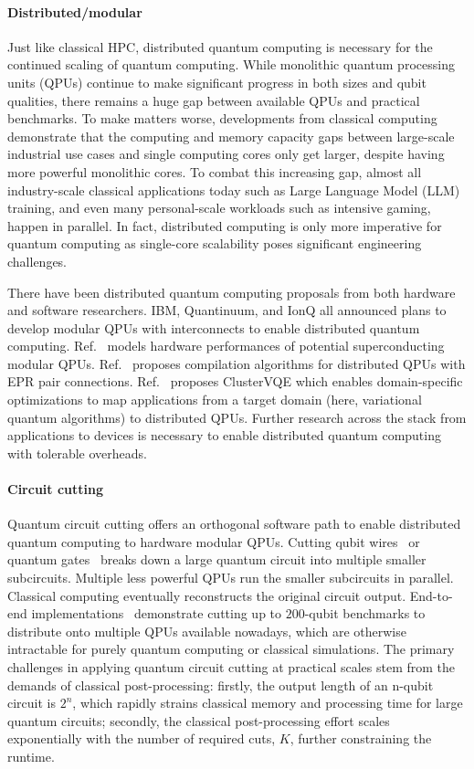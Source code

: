 \paragraph{Distributed/modular}
Just like classical HPC, distributed quantum computing is necessary for the continued scaling of quantum computing. While monolithic quantum processing units (QPUs) continue to make significant progress in both sizes and qubit qualities, there remains a huge gap between available QPUs and practical benchmarks. To make matters worse, developments from classical computing demonstrate that the computing and memory capacity gaps between large-scale industrial use cases and single computing cores only get larger, despite having more powerful monolithic cores. To combat this increasing gap, almost all industry-scale classical applications today such as Large Language Model (LLM) training, and even many personal-scale workloads such as intensive gaming, happen in parallel. In fact, distributed computing is only more imperative for quantum computing as single-core scalability poses significant engineering challenges.

There have been distributed quantum computing proposals from both hardware and software researchers. IBM, Quantinuum, and IonQ all announced plans to develop modular QPUs with interconnects to enable distributed quantum computing.
Ref.~\cite{ang2022architectures} models hardware performances of potential superconducting modular QPUs.
Ref.~\cite{wu2022collcomm} proposes compilation algorithms for distributed QPUs with EPR pair connections. 
Ref.~\cite{Zhang_2022} proposes ClusterVQE which enables domain-specific optimizations to map applications from a target domain (here, variational quantum algorithms) to distributed QPUs.
Further research across the stack from applications to devices is necessary to enable distributed quantum computing with tolerable overheads.

\paragraph{Circuit cutting}
Quantum circuit cutting offers an orthogonal software path to enable distributed quantum computing to hardware modular QPUs. Cutting qubit wires~\cite{peng2020simulating} or quantum gates~\cite{piveteau2023circuit} breaks down a large quantum circuit into multiple smaller subcircuits. Multiple less powerful QPUs run the smaller subcircuits in parallel. Classical computing eventually reconstructs the original circuit output. End-to-end implementations~\cite{tang2021cutqc, tang2022scaleqc} demonstrate cutting up to $200$-qubit benchmarks to distribute onto multiple QPUs available nowadays, which are otherwise intractable for purely quantum computing or classical simulations. The primary challenges in applying quantum circuit cutting at practical scales stem from the demands of classical post-processing: firstly, the output length of an n-qubit circuit is $2^n$, which rapidly strains classical memory and processing time for large quantum circuits; secondly, the classical post-processing effort scales exponentially with the number of required cuts, $K$, further constraining the runtime.

